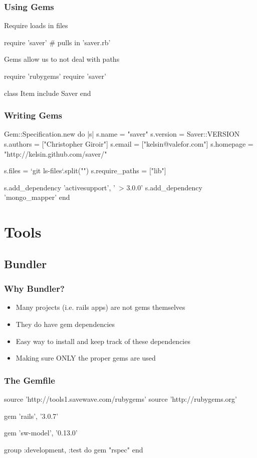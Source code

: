\begin{frame}[fragile]
  \frametitle{Using Gems}
  Require loads in files
  \begin{rubycode}
    require 'saver' # pulls in 'saver.rb'
  \end{rubycode}
  Gems allow us to not deal with paths
  \begin{rubycode}
    require 'rubygems'
    require 'saver'

    class Item
      include Saver
    end
  \end{rubycode}
\end{frame}

\begin{frame}[fragile]
  \frametitle{Writing Gems}
  \begin{rubycode}
    Gem::Specification.new do |s|
      s.name        = "saver"
      s.version     = Saver::VERSION
      s.authors     = ["Christopher Giroir"]
      s.email       = ["kelsin@valefor.com"]
      s.homepage    = "http://kelsin.github.com/saver/"

      s.files         = `git ls-files`.split("\n")
      s.require_paths = ["lib"]

      s.add_dependency 'activesupport', '~> 3.0.0'
      s.add_dependency 'mongo_mapper'
    end
  \end{rubycode}
\end{frame}

\section{Tools}

\subsection{Bundler}

\begin{frame}
  \frametitle{Why Bundler?}
  \begin{itemize}
  \item Many projects (i.e. rails apps) are not gems themselves
  \item They do have gem dependencies
  \pause
  \item Easy way to install and keep track of these dependencies
  \pause
  \item Making sure ONLY the proper gems are used
  \end{itemize}
\end{frame}

\begin{frame}[fragile]
  \frametitle{The Gemfile}
  \begin{rubycode}
    source 'http://tools1.savewave.com/rubygems'
    source 'http://rubygems.org'

    gem 'rails', '3.0.7'

    gem 'sw-model', '0.13.0'

    group :development, :test do
      gem "rspec"
    end
  \end{rubycode}
\end{frame}

